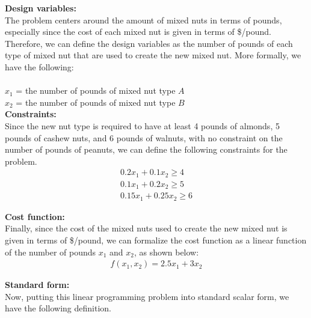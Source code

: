 \documentclass[11pt]{article}
\begin{document}
\begin{prob}{1}
\end{prob}
\begin{sol} 

\textbf{Design variables:} \\ 
The problem centers around the amount of mixed nuts in terms of pounds, especially since the cost of each mixed nut is given in terms of \$/pound. Therefore, we can define the design variables as the number of pounds of each type of mixed nut that are used to create the new mixed nut. More formally, we have the following: \\ \\
$x_{1}$ = the number of pounds of mixed nut type $A$ \\
$x_{2}$ = the number of pounds of mixed nut type $B$ \\

\textbf{Constraints:}  \\
Since the new nut type is required to have at least 4 pounds of almonds, 5 pounds of cashew nuts, and 6 pounds of walnuts, with no constraint on the number of pounds of peanuts, we can define the following constraints for the problem. 
\begin{eqnarray*}
0.2x_{1} + 0.1x_{2} \geq 4 \\
0.1x_{1} + 0.2x_{2} \geq 5 \\
0.15x_{1} + 0.25x_{2} \geq 6 
\end{eqnarray*}

\textbf{Cost function:} \\
Finally, since the cost of the mixed nuts used to create the new mixed nut is given in terms of \$/pound, we can formalize the cost function as a linear function of the number of pounds $x_{1}$ and $x_{2}$, as shown below:
\begin{eqnarray*}
f(x_{1},x_{2}) = 2.5x_{1} + 3x_{2}
\end{eqnarray*}

\textbf{Standard form:} \\
Now, putting this linear programming problem into standard scalar form, we have the following definition.  \\


\end{sol}
\end{document}

